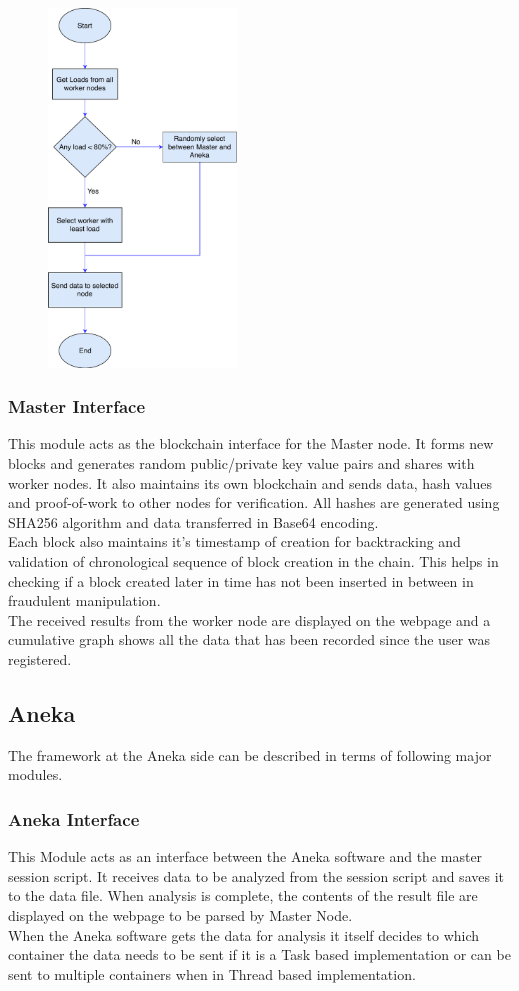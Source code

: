 \documentclass[10pt,journal,compsoc]{IEEEtran}
\begin{document}
\begin{figure}[h]
\centering
\includegraphics[width=5cm]{load-balancing}
\end{figure}

\subsubsection{Master Interface}
This module acts as the blockchain interface for the Master node. It forms new blocks and generates random public/private key value pairs and shares with worker nodes. It also maintains its own blockchain and sends data, hash values and proof-of-work to other nodes for verification. All hashes are generated using SHA256 algorithm and data transferred in Base64 encoding.\\ 
Each block also maintains it’s timestamp of creation for backtracking and validation of chronological sequence of block creation in the chain. This helps in checking if a block created later in time has not been inserted in between in fraudulent manipulation. \\
The received results from the worker node are displayed on the webpage and a cumulative graph shows all the data that has been recorded since the user was registered. 

\subsection{Aneka}
The framework at the Aneka side can be described in terms of following major modules.

\subsubsection{Aneka Interface}
This Module acts as an interface between the Aneka software and the master session script. It receives data to be analyzed from the session script and saves it to the data file. When analysis is complete, the contents of the result file are displayed on the webpage to be parsed by Master Node.\\ 
When the Aneka software gets the data for analysis it itself decides to which container the data needs to be sent if it is a Task based implementation or can be sent to multiple containers when in Thread based implementation. 
\end{document}
